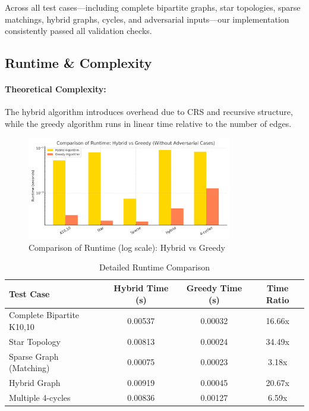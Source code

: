 \documentclass[11pt]{article}
\begin{document}
Across all test cases—including complete bipartite graphs, star topologies, sparse matchings, hybrid graphs, cycles, and adversarial inputs—our implementation consistently passed all validation checks.

\subsection{Runtime \& Complexity}

\paragraph{Theoretical Complexity:}
The hybrid algorithm introduces overhead due to CRS and recursive structure, while the greedy algorithm runs in linear time relative to the number of edges.

\begin{figure}[H]
    \centering
    \includegraphics[width=0.8\textwidth]{runtime_comparison.png}
    \caption{Comparison of Runtime (log scale): Hybrid vs Greedy}
\end{figure}

\begin{table}[H]
\centering
\caption{Detailed Runtime Comparison}
\begin{tabular}{|l|c|c|c|}
\hline
\textbf{Test Case} & \textbf{Hybrid Time (s)} & \textbf{Greedy Time (s)} & \textbf{Time Ratio} \\
\hline
Complete Bipartite K10,10     & 0.00537 & 0.00032 & 16.66x \\
Star Topology                 & 0.00813 & 0.00024 & 34.49x \\
Sparse Graph (Matching)       & 0.00075 & 0.00023 & 3.18x  \\
Hybrid Graph                  & 0.00919 & 0.00045 & 20.67x \\
Multiple 4-cycles             & 0.00836 & 0.00127 & 6.59x  \\
\hline
\end{tabular}
\end{table}
\end{document}

